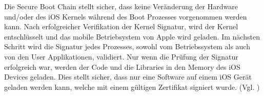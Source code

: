 Die Secure Boot Chain stellt sicher, dass keine Veränderung der Hardware und/oder des iOS Kernels während des Boot Prozesses vorgenommen werden kann. Nach erfolgreicher Verifikation der Kernel Signatur, wird der Kernel entschlüsselt und das mobile Betriebsystem von Apple wird geladen. Im nächsten Schritt wird die Signatur jedes Prozesses, sowohl vom Betriebssystem als auch von den User Applikationen, validiert. Nur wenn die Prüfung der Signatur erfolgreich war, werden der Code und die Libraries in den Memory des iOS Devices geladen. Dies stellt sicher, dass nur eine Software auf einem iOS Gerät geladen werden kann, welche mit einem gültigen Zertifikat signiert wurde. (Vgl. \cite{Apple[4], Apple[5], Apple[6]})

%
%
%
%


